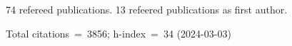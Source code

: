 74 refereed publications. 13 refeered publications as first author.

Total citations~=~3856; h-index~=~34 (2024-03-03)